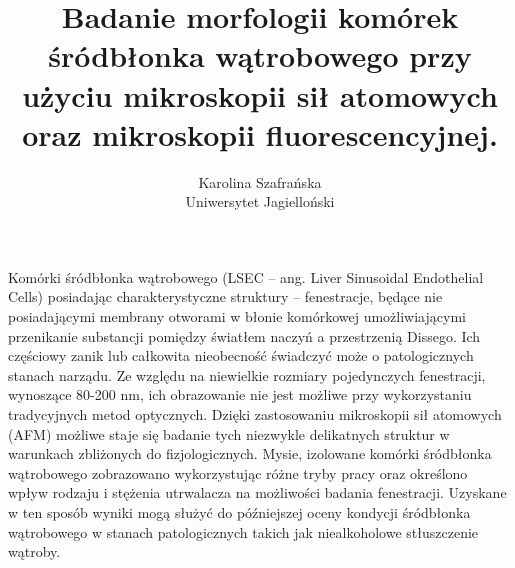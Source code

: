 \documentclass[12pt, a4paper]{article}
\begin{document}
\title{Badanie morfologii komórek śródbłonka wątrobowego przy użyciu mikroskopii sił atomowych oraz mikroskopii fluorescencyjnej.}
\author{Karolina Szafrańska \\Uniwersytet Jagielloński}
\date {}
\maketitle
\thispagestyle{title}
Komórki śródbłonka wątrobowego (LSEC – ang. Liver Sinusoidal Endothelial Cells) posiadając charakterystyczne struktury – fenestracje, będące nie posiadającymi membrany otworami w błonie komórkowej umożliwiającymi przenikanie substancji pomiędzy światłem naczyń a przestrzenią Dissego. Ich częściowy zanik lub całkowita nieobecność świadczyć może o patologicznych stanach narządu. Ze względu na niewielkie rozmiary pojedynczych fenestracji, wynoszące 80-200 nm, ich obrazowanie nie jest możliwe przy wykorzystaniu tradycyjnych metod optycznych. Dzięki zastosowaniu mikroskopii sił atomowych (AFM) możliwe staje się badanie tych niezwykle delikatnych struktur w warunkach zbliżonych do fizjologicznych. Mysie, izolowane komórki śródbłonka wątrobowego zobrazowano wykorzystując różne tryby pracy oraz określono wpływ rodzaju i stężenia utrwalacza na możliwości badania fenestracji. Uzyskane w ten sposób wyniki mogą służyć do późniejszej oceny kondycji śródbłonka wątrobowego w stanach patologicznych takich jak niealkoholowe stłuszczenie wątroby.
\end{document}
